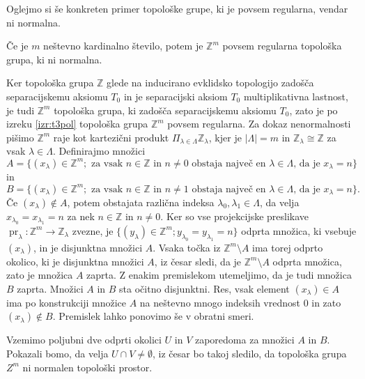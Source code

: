 \documentclass[mat1]{fmfdelo}
\newcommand{\Z}{\mathbb Z}
\DeclareMathOperator{\pr}{pr}
\begin{document}
Oglejmo si še konkreten primer topološke grupe, ki je povsem regularna, vendar ni normalna.

\begin{izrek}\label{izr:t4protiprimer}
Če je $m$ neštevno kardinalno število, potem je $\Z^{m}$ povsem regularna topološka grupa, ki ni normalna.
\end{izrek}

\begin{dokaz}
Ker topološka grupa $\Z$ glede na inducirano evklidsko topologijo zadošča separacijskemu aksiomu $T_0$ in je separacijski aksiom $T_0$ multiplikativna lastnost, je tudi $\Z^m$ topološka grupa, ki zadošča separacijskemu aksiomu $T_0$, zato je po izreku \ref{izr:t3pol} topološka grupa $\Z^m$ povsem regularna. Za dokaz nenormalnosti pišimo $\Z^m$ raje kot kartezični produkt $\Pi_{\lambda \in \Lambda}\Z_\lambda$, kjer je $|\Lambda| = m$ in $\Z_\lambda \cong \Z$ za vsak $\lambda \in \Lambda$. Definirajmo množici
\[ A = \lbrace (x_\lambda) \in \Z^m ; \text{ za vsak $n \in \Z$ in $n \neq 0$ obstaja največ en $\lambda \in \Lambda$, da je $x_\lambda = n$}\rbrace \]
in
\[ B = \lbrace (x_\lambda) \in \Z^m ; \text{ za vsak $n \in \Z$ in $n \neq 1$ obstaja največ en $\lambda \in \Lambda$, da je $x_\lambda = n$}\rbrace. \]
Če $(x_\lambda) \notin A$, potem obstajata različna indeksa $\lambda_0, \lambda_1 \in \Lambda$, da velja $x_{\lambda_0} = x_{\lambda_1} = n$ za nek $n \in \Z$ in $n \neq 0$. Ker so vse projekcijske preslikave $\pr_{\lambda}\colon \Z^m \to \Z_\lambda$ zvezne, je $\lbrace (y_\lambda) \in \Z^m ; y_{\lambda_0} = y_{\lambda_1} = n \rbrace$ odprta množica, ki vsebuje $(x_\lambda)$, in je disjunktna množici $A$. Vsaka točka iz $\Z^m\setminus A$ ima torej odprto okolico, ki je disjunktna množici $A$, iz česar sledi, da je $\Z^m\setminus A$ odprta množica, zato je množica $A$ zaprta. Z enakim premislekom utemeljimo, da je tudi množica $B$ zaprta. Množici $A$ in $B$ sta očitno disjunktni. Res, vsak element $(x_\lambda) \in A$ ima po konstrukciji množice $A$ na neštevno mnogo indeksih vrednost $0$ in zato $(x_\lambda) \notin B$. Premislek lahko ponovimo še v obratni smeri.

Vzemimo poljubni dve odprti okolici $U$ in $V$ zaporedoma za množici $A$ in $B$. Pokazali bomo, da velja $U \cap V \neq \emptyset$, iz česar bo takoj sledilo, da topološka grupa $Z^m$ ni normalen topološki prostor.


\end{dokaz}
\end{document}
